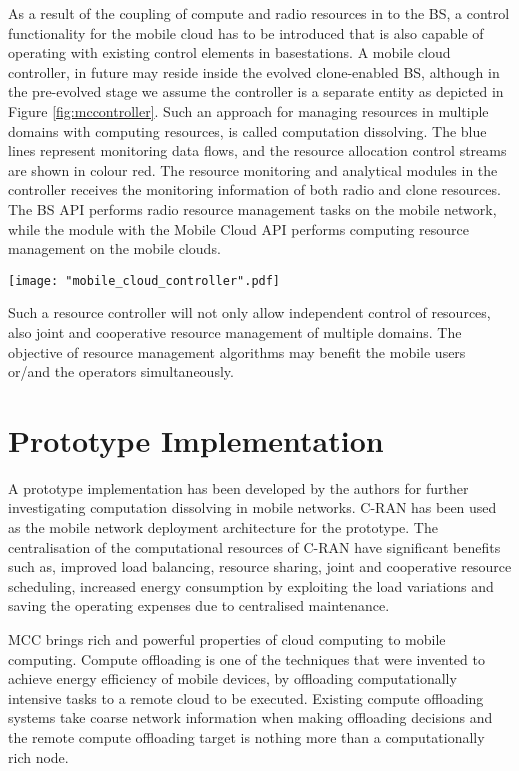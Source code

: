 \documentclass[12pt,journal,compsoc, onecolumn]{IEEEtran}
\begin{document}
As a result of the coupling of compute and radio resources in to the BS, a control functionality for the mobile cloud has to be introduced that is also capable of operating with existing control elements in basestations. A mobile cloud controller, in future may reside inside the evolved clone-enabled BS, although in the pre-evolved stage we assume the controller is a separate entity as depicted in Figure \ref{fig:mccontroller}. Such an approach for managing resources in multiple domains with computing resources, is called computation dissolving. The blue lines represent monitoring data flows, and the resource allocation control streams are shown in colour red.  The resource monitoring and analytical modules in the controller receives the monitoring information of both radio and clone resources. The BS API performs radio resource management tasks on the mobile network, while the module with the Mobile Cloud API performs computing resource management on the mobile clouds.

\begin{figure*}[ht]
\centering
\texttt{[image: "mobile\_cloud\_controller".pdf]}
\caption{\label{fig:mccontroller} Mobile Cloud Controller for computation dissolving}
\end{figure*}

Such a resource controller will not only allow independent control of resources, also joint and cooperative resource management of multiple domains. The objective of resource management algorithms may benefit the mobile users or/and the operators simultaneously.

\section{Prototype Implementation}
\label{sec:mcprototype}

A prototype implementation has been developed by the authors for further investigating computation dissolving in mobile networks. C-RAN has been used as the mobile network deployment architecture for the prototype. The centralisation of the computational resources of C-RAN have significant benefits such as, improved load balancing, resource sharing, joint and cooperative resource scheduling, increased energy consumption by exploiting the load variations and saving the operating expenses due to centralised maintenance. 

MCC brings rich and powerful properties of cloud computing to mobile computing. Compute offloading is one of the techniques that were invented to achieve energy efficiency of mobile devices, by offloading computationally intensive tasks to a remote cloud to be executed. Existing compute offloading systems take coarse network information when making offloading decisions and the remote compute offloading target is nothing more than a computationally rich node.
\end{document}
